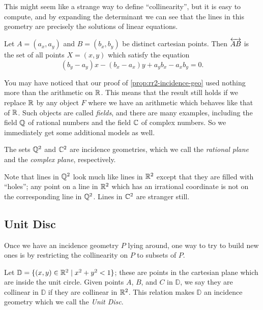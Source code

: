 This might seem like a strange way to define ``collinearity'', but it is easy to compute, and by expanding the determinant we can see that the lines in this geometry are precisely the solutions of linear equations.

\begin{cor}[Lines in \(\RR^2\)] \label{cor:cartesian-lines}
Let \(A = (a_x, a_y)\) and \(B = (b_x, b_y)\) be distinct cartesian points.
Then \(\overleftrightarrow{AB}\) is the set of all points \(X = (x,y)\) which satisfy the equation \[ (b_y-a_y)x - (b_x-a_x)y + a_yb_x - a_xb_y = 0. \]
\end{cor}

You may have noticed that our proof of \ref{prop:rr2-incidence-geo} used nothing more than the arithmetic on \(\mathbb{R}\).
This means that the result still holds if we replace \(\mathbb{R}\) by any object \(F\) where we have an arithmetic which behaves like that of \(\mathbb{R}\).
Such objects are called \emph{fields}, and there are many examples, including the field \(\mathbb{Q}\) of rational numbers and the field \(\mathbb{C}\) of complex numbers.
So we immediately get some additional models as well.

\begin{cor}
The sets \(\mathbb{Q}^2\) and \(\mathbb{C}^2\) are incidence geometries, which we call the \emph{rational plane} and the \emph{complex plane}, respectively.
\end{cor}

Note that lines in \(\mathbb{Q}^2\) look much like lines in \(\RR^2\) except that they are filled with ``holes''; any point on a line in \(\RR^2\) which has an irrational coordinate is not on the corresponding line in \(\mathbb{Q}^2\).
Lines in \(\mathbb{C}^2\) are stranger still.


\subsection{Unit Disc}

Once we have an incidence geometry \(P\) lying around, one way to try to build new ones is by restricting the collinearity on \(P\) to subsets of \(P\).

\begin{prop}
Let \(\mathbb{D} = \{ (x,y) \in \mathbb{R}^2 \mid x^2 + y^2 < 1 \}\); these are points in the cartesian plane which are inside the unit circle.
Given points \(A\), \(B\), and \(C\) in \(\mathbb{D}\), we say they are collinear in \(\mathbb{D}\) if they are collinear in \(\RR^2\).
This relation makes \(\mathbb{D}\) an incidence geometry which we call the \emph{Unit Disc}.
\end{prop}

